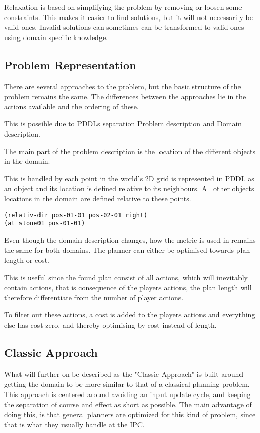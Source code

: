 	Relaxation is based on simplifying the problem by removing or loosen some constraints. This makes it easier to find solutions, but it will not necessarily be valid ones. Invalid solutions can sometimes can be transformed to valid ones using domain specific knowledge.
	
	\subsection{Problem Representation}
		There are several approaches to the problem, but the basic structure of the problem remains the same. The differences between the approaches lie in the actions available and the ordering of these. 

		This is possible due to PDDLs separation Problem description and Domain description.
		
		The main part of the problem description is the location of the different objects in the domain. 

		This is handled by each point in the world's 2D grid is represented in PDDL as an object and its location is defined relative to its neighbours. All other objects locations in the domain are defined relative to these points.
		\begin{lstlisting}
(relativ-dir pos-01-01 pos-02-01 right)
(at stone01 pos-01-01)
		\end{lstlisting}
		

		
		Even though the domain description changes, how the metric is used in remains the same for both domains. The planner can either be optimised towards plan length or cost. 

		This is useful since the found plan consist of all actions, which will inevitably contain actions, that is consequence of the players actions, the plan length will therefore differentiate from the number of player actions. 


		To filter out these actions, a cost is added to the players actions and everything else has cost zero. 
		and thereby optimising by cost instead of length.
	
		
		\subsection{Classic Approach}
		What will further on be described as the "Classic Approach" is built around getting the domain to be more similar to that of a classical planning problem. 
		This approach is centered around avoiding an input update cycle, and keeping the separation of course and effect as short as possible. The main advantage of doing this, is that general planners are optimized for this kind of problem, since that is what they usually handle at the IPC.
		
